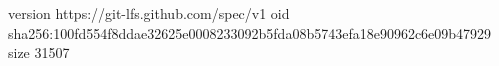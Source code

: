 version https://git-lfs.github.com/spec/v1
oid sha256:100fd554f8ddae32625e0008233092b5fda08b5743efa18e90962c6e09b47929
size 31507
